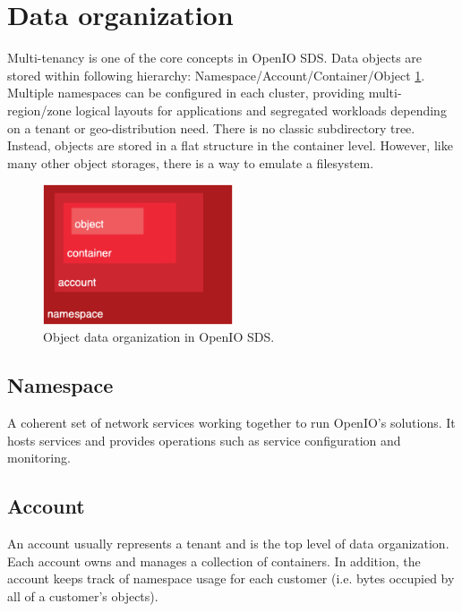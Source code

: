     \section{Data organization}
    Multi-tenancy is one of the core concepts in OpenIO SDS. Data objects are stored within following hierarchy: Namespace/Account/Container/Object \ref{fig:oioDataOrganization}. Multiple namespaces can be configured in each cluster, providing multi-region/zone logical layouts for applications and segregated workloads depending on a tenant or geo-distribution need\cite{oioSdsConcepts}.
    There is no classic subdirectory tree. Instead, objects are stored in a flat structure in the container level. However, like many other object storages, there is a way to emulate a filesystem.

    \begin{figure}[hbt]
        \centering
        \includegraphics[width=0.5\textwidth]{obrazky-figures/openio-data-organization.eps}
        \caption{Object data organization in OpenIO SDS.\cite{oioCoreSolution}}
        \label{fig:oioDataOrganization}
    \end{figure}

    \subsection{Namespace}
    A coherent set of network services working together to run OpenIO's solutions. It hosts services and provides operations such as service configuration and monitoring.

    \subsection{Account}
    An account usually represents a tenant and is the top level of data organization. Each account owns and manages a collection of containers. In addition, the account keeps track of namespace usage for each customer (i.e. bytes occupied by all of a customer's objects)\cite{oioCoreSolution}.

